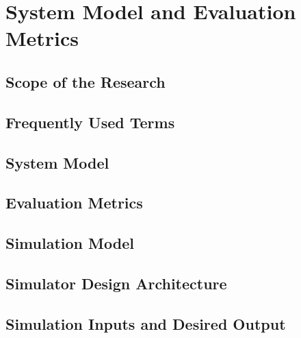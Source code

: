 \documentclass[10pt]{llncs}
\begin{document}
%
\section{System Model and Evaluation Metrics}

%
\subsection{Scope of the Research}


%
\subsection{Frequently Used Terms}

%
\subsection{System Model}


%
\subsection{Evaluation Metrics}


%
\subsection{Simulation Model}


%
\subsection{Simulator Design Architecture}


%
\subsection{Simulation Inputs and Desired Output}
\end{document}
